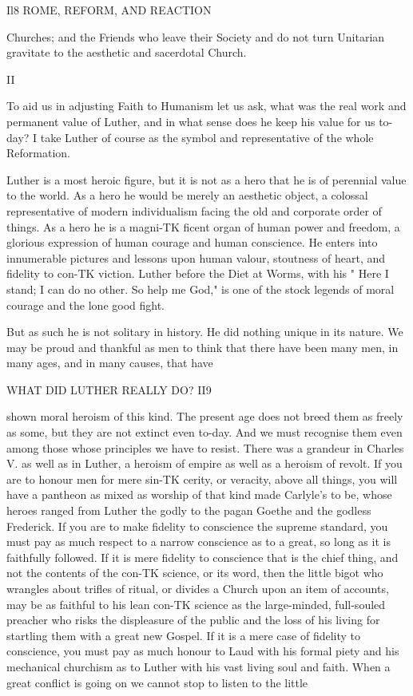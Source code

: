 \documentclass[12pt,a5paper,twoside]{book}
\begin{document}
Il8 ROME, REFORM, AND REACTION 

Churches; and the Friends who leave their Society 
and do not turn Unitarian gravitate to the aesthetic 
and sacerdotal Church. 

II 

To aid us in adjusting Faith to Humanism let us 
ask, what was the real work and permanent value of 
Luther, and in what sense does he keep his value for 
us to-day? I take Luther of course as the symbol 
and representative of the whole Reformation. 

Luther is a most heroic figure, but it is not as a 
hero that he is of perennial value to the world. As a 
hero he would be merely an aesthetic object, a colossal 
representative of modern individualism facing the old 
and corporate order of things. As a hero he is a magni-TK
ficent organ of human power and freedom, a glorious 
expression of human courage and human conscience. 
He enters into innumerable pictures and lessons upon 
human valour, stoutness of heart, and fidelity to con-TK
viction. Luther before the Diet at Worms, with his 
" Here I stand; I can do no other. So help me 
God," is one of the stock legends of moral courage 
and the lone good fight. 

But as such he is not solitary in history. He did 
nothing unique in its nature. We may be proud and 
thankful as men to think that there have been many 
men, in many ages, and in many causes, that have 



WHAT DID LUTHER REALLY DO? II9 

shown moral heroism of this kind. The present age 
does not breed them as freely as some, but they are 
not extinct even to-day. And we must recognise 
them even among those whose principles we have to 
resist. There was a grandeur in Charles V. as well 
as in Luther, a heroism of empire as well as a heroism 
of revolt. If you are to honour men for mere sin-TK
cerity, or veracity, above all things, you will have a 
pantheon as mixed as worship of that kind made 
Carlyle's to be, whose heroes ranged from Luther the 
godly to the pagan Goethe and the godless Frederick. 
If you are to make fidelity to conscience the supreme 
standard, you must pay as much respect to a narrow 
conscience as to a great, so long as it is faithfully 
followed. If it is mere fidelity to conscience that is 
the chief thing, and not the contents of the con-TK
science, or its word, then the little bigot who wrangles 
about trifles of ritual, or divides a Church upon an 
item of accounts, may be as faithful to his lean con-TK
science as the large-minded, full-souled preacher who 
risks the displeasure of the public and the loss of his 
living for startling them with a great new Gospel. 
If it is a mere case of fidelity to conscience, you must 
pay as much honour to Laud with his formal piety 
and his mechanical churchism as to Luther with his 
vast living soul and faith. When a great conflict 
is going on we cannot stop to listen to the little 
\end{document}
